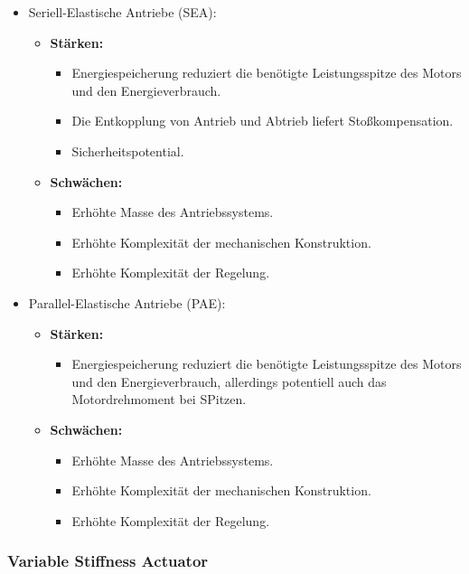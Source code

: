 			\begin{itemize}
				\item Seriell-Elastische Antriebe (SEA):
					\begin{itemize}
						\item \textbf{Stärken:}
							\begin{itemize}
								\item Energiespeicherung reduziert die benötigte Leistungsspitze des Motors und den Energieverbrauch.
								\item Die Entkopplung von Antrieb und Abtrieb liefert Stoßkompensation.
								\item Sicherheitspotential.
							\end{itemize}
						\item \textbf{Schwächen:}
							\begin{itemize}
								\item Erhöhte Masse des Antriebssystems.
								\item Erhöhte Komplexität der mechanischen Konstruktion.
								\item Erhöhte Komplexität der Regelung.
							\end{itemize}
					\end{itemize}
				\item Parallel-Elastische Antriebe (PAE):
					\begin{itemize}
						\item \textbf{Stärken:}
							\begin{itemize}
								\item Energiespeicherung reduziert die benötigte Leistungsspitze des Motors und den Energieverbrauch, allerdings potentiell auch das Motordrehmoment bei SPitzen.
							\end{itemize}
						\item \textbf{Schwächen:}
							\begin{itemize}
								\item Erhöhte Masse des Antriebssystems.
								\item Erhöhte Komplexität der mechanischen Konstruktion.
								\item Erhöhte Komplexität der Regelung.
							\end{itemize}
					\end{itemize}
			\end{itemize}

			\subsubsection{Variable Stiffness Actuator} %


